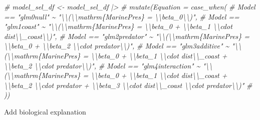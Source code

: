 \documentclass[
]{article}
\newenvironment{Shaded}{\begin{snugshade}}{\end{snugshade}}
\newcommand{\CommentTok}[1]{\textcolor[rgb]{0.56,0.35,0.01}{\textit{#1}}}
\begin{document}
\begin{Shaded}
\begin{Highlighting}[]
\CommentTok{\# model\_sel\_df \textless{}{-} model\_sel\_df |\textgreater{} }
\CommentTok{\#   mutate(Equation = case\_when(}
\CommentTok{\#     Model == "glm0null" \textasciitilde{} "\textbackslash{}\textbackslash{}(\textbackslash{}\textbackslash{}mathrm\{MarinePres\} = \textbackslash{}\textbackslash{}beta\_0\textbackslash{}\textbackslash{})",}
\CommentTok{\#     Model == "glm1coast" \textasciitilde{} "\textbackslash{}\textbackslash{}(\textbackslash{}\textbackslash{}mathrm\{MarinePres\} = \textbackslash{}\textbackslash{}beta\_0 + \textbackslash{}\textbackslash{}beta\_1 \textbackslash{}\textbackslash{}cdot dist\textbackslash{}\textbackslash{}\_coast\textbackslash{}\textbackslash{})",}
\CommentTok{\#     Model == "glm2predator" \textasciitilde{} "\textbackslash{}\textbackslash{}(\textbackslash{}\textbackslash{}mathrm\{MarinePres\} = \textbackslash{}\textbackslash{}beta\_0 + \textbackslash{}\textbackslash{}beta\_2 \textbackslash{}\textbackslash{}cdot predator\textbackslash{}\textbackslash{})",}
\CommentTok{\#     Model == "glm3additive" \textasciitilde{} "\textbackslash{}\textbackslash{}(\textbackslash{}\textbackslash{}mathrm\{MarinePres\} = \textbackslash{}\textbackslash{}beta\_0 + \textbackslash{}\textbackslash{}beta\_1 \textbackslash{}\textbackslash{}cdot dist\textbackslash{}\textbackslash{}\_coast + \textbackslash{}\textbackslash{}beta\_2 \textbackslash{}\textbackslash{}cdot predator\textbackslash{}\textbackslash{})",}
\CommentTok{\#     Model == "glm4interaction" \textasciitilde{} "\textbackslash{}\textbackslash{}(\textbackslash{}\textbackslash{}mathrm\{MarinePres\} = \textbackslash{}\textbackslash{}beta\_0 + \textbackslash{}\textbackslash{}beta\_1 \textbackslash{}\textbackslash{}cdot dist\textbackslash{}\textbackslash{}\_coast + \textbackslash{}\textbackslash{}beta\_2 \textbackslash{}\textbackslash{}cdot predator + \textbackslash{}\textbackslash{}beta\_3 \textbackslash{}\textbackslash{}cdot dist\textbackslash{}\textbackslash{}\_coast \textbackslash{}\textbackslash{}cdot predator\textbackslash{}\textbackslash{})"}
\CommentTok{\#   ))}
\end{Highlighting}
\end{Shaded}

Add biological explanation
\end{document}
